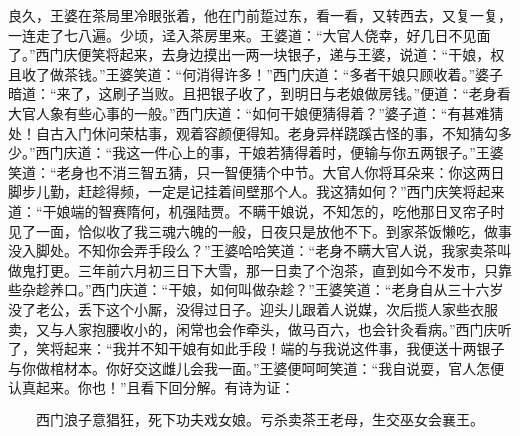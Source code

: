 良久，王婆在茶局里冷眼张着，他在门前踅过东，看一看，又转西去，又复一复，一连走了七八遍。少顷，迳入茶房里来。王婆道：“大官人侥幸，好几日不见面了。”西门庆便笑将起来，去身边摸出一两一块银子，递与王婆，说道：“干娘，权且收了做茶钱。”王婆笑道：“何消得许多！”西门庆道：“多者干娘只顾收着。”婆子暗道：“来了，这刷子当败。且把银子收了，到明日与老娘做房钱。”便道：“老身看大官人象有些心事的一般。”西门庆道：“如何干娘便猜得着？”婆子道：“有甚难猜处！自古入门休问荣枯事，观着容颜便得知。老身异样跷蹊古怪的事，不知猜勾多少。”西门庆道：“我这一件心上的事，干娘若猜得着时，便输与你五两银子。”王婆笑道：“老身也不消三智五猜，只一智便猜个中节。大官人你将耳朵来：你这两日脚步儿勤，赶趁得频，一定是记挂着间壁那个人。我这猜如何？”西门庆笑将起来道：“干娘端的智赛隋何，机强陆贾。不瞒干娘说，不知怎的，吃他那日叉帘子时见了一面，恰似收了我三魂六魄的一般，日夜只是放他不下。到家茶饭懒吃，做事没入脚处。不知你会弄手段么？”王婆哈哈笑道：“老身不瞒大官人说，我家卖茶叫做鬼打更。三年前六月初三日下大雪，那一日卖了个泡茶，直到如今不发市，只靠些杂趁养口。”西门庆道：“干娘，如何叫做杂趁？”王婆笑道：“老身自从三十六岁没了老公，丢下这个小厮，没得过日子。迎头儿跟着人说媒，次后揽人家些衣服卖，又与人家抱腰收小的，闲常也会作牵头，做马百六，也会针灸看病。”西门庆听了，笑将起来：“我并不知干娘有如此手段！端的与我说这件事，我便送十两银子与你做棺材本。你好交这雌儿会我一面。”王婆便呵呵笑道：“我自说耍，官人怎便认真起来。你也！”且看下回分解。有诗为证：

\[
西门浪子意猖狂，死下功夫戏女娘。
亏杀卖茶王老母，生交巫女会襄王。　
\]